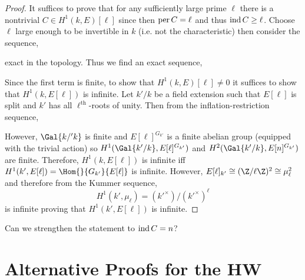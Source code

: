 \documentclass[12pt]{article}
\begin{document}
\begin{proof}
It suffices to prove that for any sufficiently large prime $\ell$ there is a nontrivial $C \in H^1(k, E)[\ell]$ since then $\operatorname{per}{C} = \ell$ and thus $\operatorname{ind}{C} \ge \ell$. Choose $\ell$ large enough to be invertible in $k$ (i.e. not the characteristic) then consider the sequence,
\begin{center}
\end{center}
exact in the \etale topology. Thus we find an exact sequence,
\begin{center}
\end{center}
Since the first term is finite, to show that $H^1(k, E)[\ell] \neq 0$ it suffices to show that $H^1(k, E[\ell])$ is infinite. Let $k'/k$ be a field extension such that $E[\ell]$ is split and $k'$ has all $\ell^{\text{th}}$-roots of unity. Then from the inflation-restriction sequence,
\begin{center}
\end{center}
However, $\Gal{k/'k}$ is finite and $E[\ell]^{G_{k'}}$ is a finite abelian group (equipped with the trivial action) so $H^1(\Gal{k'/k}, E[\ell]^{G_{k'}})$ and $H^2(\Gal{k'/k}, E[n]^{G_{k'}})$ are finite. Therefore, $H^1(k, E[\ell])$ is infinite iff $H^1(k', E[\ell]) = \Hom{}{G_{k'}}{E[\ell]}$ is infinite. However, $E[\ell]_{k'} \cong (\Z / \ell \Z)^2 \cong \mu_\ell^2$ and therefore from the Kummer sequence, 
\[ H^1(k', \mu_\ell) = (k'^\times) / (k'^\times)^\ell \]
is infinite proving that $H^1(k', E[\ell])$ is infinite.
\end{proof}


\begin{rmk}
Can we strengthen the statement to $\operatorname{ind}{C} = n$?
\end{rmk}

\section{Alternative Proofs for the HW}
\end{document}
